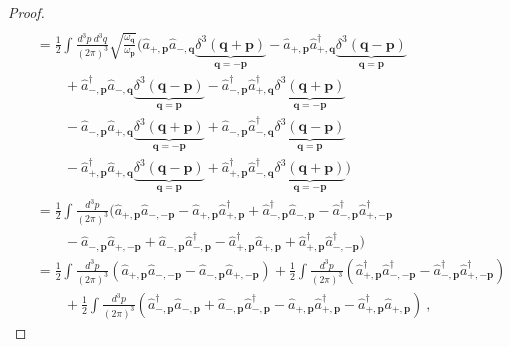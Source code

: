 \begin{proof}
\begin{equation*}
\begin{aligned}
        \end{aligned}
        \end{equation*}
        \begin{equation*}
        \begin{aligned}
            \phantom{\hat Q} & = \frac{1}{2} \int \frac{d^3 p ~ d^3 q}{(2\pi)^3} \sqrt{\frac{\omega_{\mathbf q}}{\omega_{\mathbf p}}} \Big ( \hat a_{+, \mathbf p} \hat a_{-, \mathbf q} \underbrace{\delta^3 (\mathbf q + \mathbf p)}_{\mathbf q = - \mathbf p} - \hat a_{+, \mathbf p} \hat a_{+, \mathbf q}^\dagger \underbrace{\delta^3 (\mathbf q - \mathbf p)}_{\mathbf q = \mathbf p} \\ & \qquad + \hat a_{-, \mathbf p}^\dagger \hat a_{-, \mathbf q} \underbrace{\delta^3 (\mathbf q - \mathbf p)}_{\mathbf q = \mathbf p} - \hat a_{-, \mathbf p}^\dagger \hat a_{+, \mathbf q}^\dagger \underbrace{\delta^3 (\mathbf q + \mathbf p)}_{\mathbf q = - \mathbf p} \\ & \qquad - \hat a_{-, \mathbf p} \hat a_{+, \mathbf q} \underbrace{\delta^3 (\mathbf q + \mathbf p)}_{\mathbf q = - \mathbf p} + \hat a_{-, \mathbf p} \hat a_{-, \mathbf q}^\dagger \underbrace{\delta^3 (\mathbf q - \mathbf p)}_{\mathbf q = \mathbf p} \\ & \qquad - \hat a_{+, \mathbf p}^\dagger \hat a_{+, \mathbf q} \underbrace{\delta^3 (\mathbf q - \mathbf p)}_{\mathbf q = \mathbf p} + \hat a_{+, \mathbf p}^\dagger \hat a_{-, \mathbf q}^\dagger \underbrace{\delta^3 (\mathbf q + \mathbf p)}_{\mathbf q = - \mathbf p} \Big) \\ & = \frac{1}{2} \int \frac{d^3 p}{(2\pi)^3} ( \hat a_{+, \mathbf p} \hat a_{-, - \mathbf p} - \hat a_{+, \mathbf p} \hat a_{+, \mathbf p}^\dagger + \hat a_{-, \mathbf p}^\dagger \hat a_{-, \mathbf p} - \hat a_{-, \mathbf p}^\dagger \hat a_{+, - \mathbf p}^\dagger \\ & \qquad - \hat a_{-, \mathbf p} \hat a_{+, - \mathbf p} + \hat a_{-, \mathbf p} \hat a_{-, \mathbf p}^\dagger - \hat a_{+, \mathbf p}^\dagger \hat a_{+, \mathbf p} + \hat a_{+, \mathbf p}^\dagger \hat a_{-, - \mathbf p}^\dagger ) \\ & = \frac{1}{2} \int \frac{d^3 p}{(2\pi)^3} ( \hat a_{+, \mathbf p} \hat a_{-, - \mathbf p} - \hat a_{-, \mathbf p} \hat a_{+, - \mathbf p} ) + \frac{1}{2} \int \frac{d^3 p}{(2\pi)^3} (\hat a_{+, \mathbf p}^\dagger \hat a_{-, - \mathbf p}^\dagger - \hat a_{-, \mathbf p}^\dagger \hat a_{+, - \mathbf p}^\dagger) \\ & \qquad + \frac{1}{2} \int \frac{d^3 p}{(2\pi)^3} (\hat a_{-, \mathbf p}^\dagger \hat a_{-, \mathbf p} + \hat a_{-, \mathbf p} \hat a_{-, \mathbf p}^\dagger - \hat a_{+, \mathbf p} \hat a_{+, \mathbf p}^\dagger - \hat a_{+, \mathbf p}^\dagger \hat a_{+, \mathbf p} ) ~,

\end{aligned}
\end{equation*}
\end{proof}
